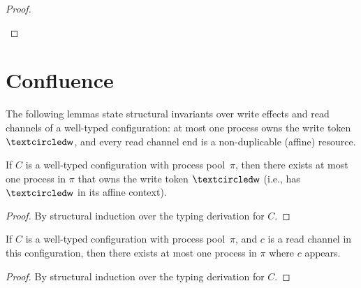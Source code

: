 \begin{theorem}[Preservation]
\begin{proof}
\begin{itemize}[leftmargin=*]
\begin{llproof}
      
    \end{llproof}    
  \end{itemize}
\end{proof}
\end{theorem}

\section{Confluence}

The following lemmas state structural invariants over write effects and read
channels of a well-typed configuration: at most one process owns the write token
$\wrtok$, and every read channel end is a non-duplicable (affine) resource.


\begin{lemma}
\label{lem:UniqueWriter}
If $C$ is a well-typed configuration with process pool~$\pi$, then there exists at
most one process in $\pi$ that owns the write token $\wrtok$ (i.e., has $\wrtok$
in its affine context).
\begin{proof}
By structural induction over the typing derivation for $C$.
\end{proof}
\end{lemma}

\begin{lemma}
\label{lem:UniqueReader}
If $C$ is a well-typed configuration with process pool~$\pi$, 
and $c$ is a read channel in this configuration,
then there exists at most one process in $\pi$ where $c$ appears.
\begin{proof}
By structural induction over the typing derivation for $C$.
\end{proof}
\end{lemma}

